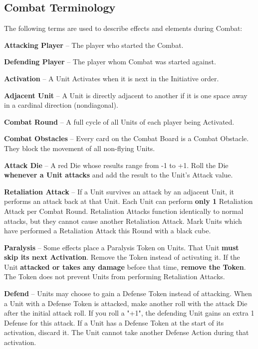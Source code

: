 \begin{multicols}{2}
\subsection*{\hypertarget{Combatterminology}{Combat Terminology}}
The following terms are used to describe effects and elements during Combat:\par
\textbf{Attacking Player} – The player who started the Combat.\par
\textbf{Defending Player} – The player whom Combat was started against.\par
\textbf{Activation} – A Unit Activates when it is next in the Initiative order.\par
\textbf{Adjacent Unit} – A Unit is directly adjacent to another if it is one space away in a cardinal direction (nondiagonal).\par
\textbf{Combat Round} – A full cycle of all Units of each player being Activated.\par
\textbf{Combat Obstacles} – Every card on the Combat Board is a Combat Obstacle.
They block the movement of all non-flying Units.\par
\textbf{Attack Die} – A red Die whose results range from -1 to +1.
Roll the Die \textbf{whenever a Unit attacks} and
add the result to the Unit's Attack value.\par
\textbf{\hypertarget{Retaliate}{Retaliation Attack}} – If a Unit survives an attack by an adjacent Unit, it performs an attack back at that Unit.
Each Unit can perform \textbf{only 1} Retaliation Attack per Combat Round.
Retaliation Attacks function identically to normal attacks, but they cannot cause another Retaliation Attack.
Mark Units which have performed a Retaliation Attack this Round with a black cube.\par
\textbf{Paralysis}  – Some effects place a Paralysis Token on Units.
That Unit \textbf{must skip its next Activation}. Remove the Token instead of activating it.
If the Unit \textbf{attacked or takes any damage} before that time, \textbf{remove the Token}.
The Token does not prevent Units from performing Retaliation Attacks.\par
\textbf{\hypertarget{Defend}{Defend}}  – Units may choose to gain a Defense Token instead of attacking.
When a Unit with a Defense Token is attacked, make another roll with the attack Die after the initial attack roll.
If you roll a "+1", the defending Unit gains an extra 1 Defense for this attack.
If a Unit has a Defense Token at the start of its activation, discard it.
The Unit cannot take another Defense Action during that activation.


\end{multicols}
